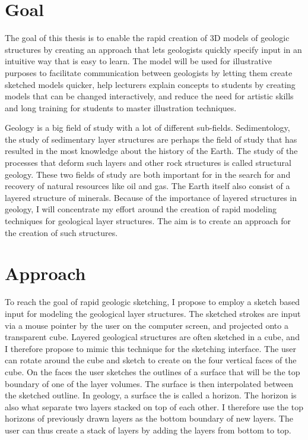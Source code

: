 \documentclass[a4paper,12pt]{report}
\begin{document}
\section{Goal}
The goal of this thesis is to enable the rapid creation of 3D models of geologic structures by creating an approach that lets geologists quickly specify input in an intuitive way that is easy to learn. The model will be used for illustrative purposes to facilitate communication between geologists by letting them create sketched models quicker, help lecturers explain concepts to students by creating models that can be changed interactively, and reduce the need for artistic skills and long training for students to master illustration techniques.

Geology is a big field of study with a lot of different sub-fields. Sedimentology, the study of sedimentary layer structures are perhaps the field of study that has resulted in the most knowledge about the history of the Earth. The study of the processes that deform such layers and other rock structures is called structural geology. These two fields of study are both important for in the search for and recovery of natural resources like oil and gas. The Earth itself also consist of a layered structure of minerals. Because of the importance of layered structures in geology, I will concentrate my effort around the creation of rapid modeling techniques for geological layer structures. The aim is to create an approach for the creation of such structures.

\section{Approach}
To reach the goal of rapid geologic sketching, I propose to employ a sketch based input for modeling the geological layer structures. The sketched strokes are input via a mouse pointer by the user on the computer screen, and projected onto a transparent cube. Layered geological structures are often sketched in a cube, and I therefore propose to mimic this technique for the sketching interface. The user can rotate around the cube and sketch to create  on the four vertical faces of the cube. On the faces the user sketches the outlines of a surface that will be the top boundary of one of the layer volumes. The surface is then interpolated between the sketched outline. In geology, a surface the is called a horizon. The horizon is also what separate two layers stacked on top of each other. I therefore use the top horizons of previously drawn layers as the bottom boundary of new layers. The user can thus create a stack of layers by adding the layers from bottom to top.
\end{document}
